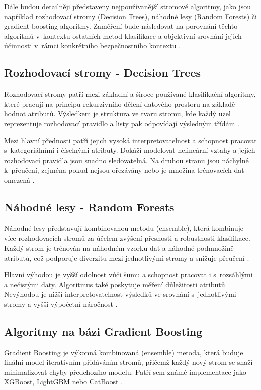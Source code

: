 Dále budou detailněji představeny nejpoužívanější stromové algoritmy, jako jsou například rozhodovací stromy (Decision Trees), náhodné lesy (Random Forests) či gradient boosting algoritmy. Zaměření bude následovat na porovnání těchto algoritmů v~kontextu ostatních metod klasifikace a objektivní srovnání jejich účinnosti v~rámci konkrétního bezpečnostního kontextu \cite{breiman2001random, ovi, ke2017lightgbm}.

\subsection*{Rozhodovací stromy - Decision Trees}

Rozhodovací stromy patří mezi základní a široce používané klasifikační algoritmy, které pracují na principu rekurzivního dělení datového prostoru na základě hodnot atributů. Výsledkem je struktura ve tvaru stromu, kde každý uzel reprezentuje rozhodovací pravidlo a listy pak odpovídají výsledným třídám \cite{quinlan1986induction}.

Mezi hlavní přednosti patří jejich vysoká interpretovatelnost a schopnost pracovat s~kategoriálními i číselnými atributy. Dokáží modelovat nelineární vztahy a jejich rozhodovací pravidla jsou snadno sledovatelná. Na druhou stranu jsou náchylné k~přeučení, zejména pokud nejsou ořezávány nebo je množina trénovacích dat omezená \cite{james2013introduction}.


\subsection*{Náhodné lesy - Random Forests}
Náhodné lesy představují kombinovanou metodu (ensemble), která kombinuje více rozhodovacích stromů za účelem zvýšení přesnosti a robustnosti klasifikace. Každý strom je trénován na náhodném vzorku dat a náhodné podmnožině atributů, což podporuje diverzitu mezi jednotlivými stromy a snižuje přeučení \cite{breiman2001random}.

Hlavní výhodou je vyšší odolnost vůči šumu a schopnost pracovat i s~rozsáhlými a nečistými daty. Algoritmus také poskytuje měření důležitosti atributů. Nevýhodou je nižší interpretovatelnost výsledků ve srovnání s~jednotlivými stromy a vyšší výpočetní náročnost \cite{liaw2002classification}.


\subsection*{Algoritmy na bázi Gradient Boosting}
Gradient Boosting je výkonná kombinovaná (ensemble) metoda, která buduje finální model iterativním přidáváním stromů, přičemž každý nový strom se snaží minimalizovat chyby předchozího modelu. Patří sem známé implementace jako XGBoost, LightGBM nebo CatBoost \cite{friedman2001greedy, chen2016xgboost, ke2017lightgbm}.


